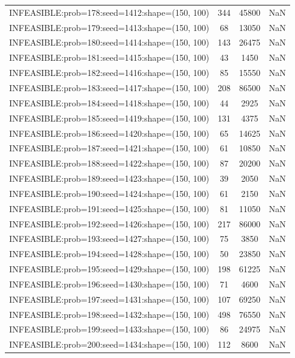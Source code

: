 \begin{longtable}{lccc}
INFEASIBLE:prob=178:seed=1412:shape=(150, 100) &   344 & 45800 &    NaN \\
INFEASIBLE:prob=179:seed=1413:shape=(150, 100) &    68 & 13050 &    NaN \\
INFEASIBLE:prob=180:seed=1414:shape=(150, 100) &   143 & 26475 &    NaN \\
INFEASIBLE:prob=181:seed=1415:shape=(150, 100) &    43 &  1450 &    NaN \\
INFEASIBLE:prob=182:seed=1416:shape=(150, 100) &    85 & 15550 &    NaN \\
INFEASIBLE:prob=183:seed=1417:shape=(150, 100) &   208 & 86500 &    NaN \\
INFEASIBLE:prob=184:seed=1418:shape=(150, 100) &    44 &  2925 &    NaN \\
INFEASIBLE:prob=185:seed=1419:shape=(150, 100) &   131 &  4375 &    NaN \\
INFEASIBLE:prob=186:seed=1420:shape=(150, 100) &    65 & 14625 &    NaN \\
INFEASIBLE:prob=187:seed=1421:shape=(150, 100) &    61 & 10850 &    NaN \\
INFEASIBLE:prob=188:seed=1422:shape=(150, 100) &    87 & 20200 &    NaN \\
INFEASIBLE:prob=189:seed=1423:shape=(150, 100) &    39 &  2050 &    NaN \\
INFEASIBLE:prob=190:seed=1424:shape=(150, 100) &    61 &  2150 &    NaN \\
INFEASIBLE:prob=191:seed=1425:shape=(150, 100) &    81 & 11050 &    NaN \\
INFEASIBLE:prob=192:seed=1426:shape=(150, 100) &   217 & 86000 &    NaN \\
INFEASIBLE:prob=193:seed=1427:shape=(150, 100) &    75 &  3850 &    NaN \\
INFEASIBLE:prob=194:seed=1428:shape=(150, 100) &    50 & 23850 &    NaN \\
INFEASIBLE:prob=195:seed=1429:shape=(150, 100) &   198 & 61225 &    NaN \\
INFEASIBLE:prob=196:seed=1430:shape=(150, 100) &    71 &  4600 &    NaN \\
INFEASIBLE:prob=197:seed=1431:shape=(150, 100) &   107 & 69250 &    NaN \\
INFEASIBLE:prob=198:seed=1432:shape=(150, 100) &   498 & 76550 &    NaN \\
INFEASIBLE:prob=199:seed=1433:shape=(150, 100) &    86 & 24975 &    NaN \\
INFEASIBLE:prob=200:seed=1434:shape=(150, 100) &   112 &  8600 &    NaN \\

\end{longtable}
